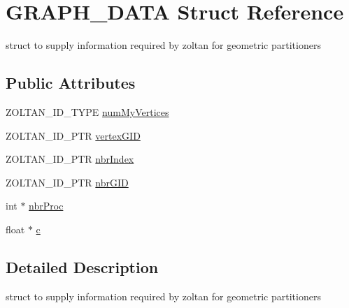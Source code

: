 \hypertarget{structGRAPH__DATA}{
\section{GRAPH\_\-DATA Struct Reference}
\label{structGRAPH__DATA}
}


struct to supply information required by zoltan for geometric partitioners  
\subsection*{Public Attributes}
\begin{DoxyCompactItemize}
\item 
ZOLTAN\_\-ID\_\-TYPE \hyperlink{structGRAPH__DATA_acf91afd46dc4b3b603d9276cbbd8b03a}{numMyVertices}
\item 
ZOLTAN\_\-ID\_\-PTR \hyperlink{structGRAPH__DATA_aa9096fe0ecdd85dcecacee0506c53f29}{vertexGID}
\item 
ZOLTAN\_\-ID\_\-PTR \hyperlink{structGRAPH__DATA_a5a9a5909b93415c0f4cf5e2ad9b1596d}{nbrIndex}
\item 
ZOLTAN\_\-ID\_\-PTR \hyperlink{structGRAPH__DATA_a7c2d0b84cdc9f48eec34d9ad6332b0c3}{nbrGID}
\item 
int $\ast$ \hyperlink{structGRAPH__DATA_ac885413f0f7d9c05484f23fe372a579b}{nbrProc}
\item 
float $\ast$ \hyperlink{structGRAPH__DATA_a2877a92dc19abd72be755179b6f38754}{c}
\end{DoxyCompactItemize}


\subsection{Detailed Description}
struct to supply information required by zoltan for geometric partitioners 

